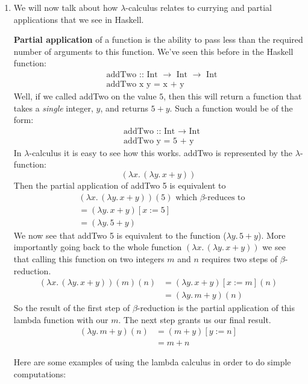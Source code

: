 \documentclass[12pt]{article}
\begin{document}
\begin{enumerate}
\item We will now talk about how $\lambda$-calculus relates to currying and partial applications that we see in Haskell.
\par \textbf{Partial application} of a function is the ability to pass less than the required number of arguments to this function. We've seen this before in the Haskell function:
\begin{align*}
	&\text{addTwo :: Int $\rightarrow$ Int $\rightarrow$ Int}\\
	&\text{addTwo x y = x + y}
\end{align*}
Well, if we called addTwo on the value $5$, then this will return a function that takes a \textit{single} integer, $y$, and returns $5 + y$. Such a function would be of the form:
\begin{align*}
	&\text{addTwo :: Int $\rightarrow$ Int}\\
	&\text{addTwo y = 5 + y}
\end{align*}
In $\lambda$-calculus it is easy to see how this works. addTwo is represented by the $\lambda$-function: $$(\lambda x.\,(\lambda y.\,x+y))$$ Then the partial application of addTwo 5 is equivalent to
\begin{align*}
&(\lambda x.\,(\lambda y.\,x+y))(5)\text{ which } \beta\text{-reduces to}\\
	&= (\lambda y. \, x + y)[x:=5]\\
	&= (\lambda y. \, 5 + y)
\end{align*}
We now see that addTwo 5 is equivalent to the function ($\lambda y. \, 5 + y$). More importantly going back to the whole function $(\lambda x.\,(\lambda y.\,x+y))$ we see that calling this function on two integers $m$ and $n$ requires two steps of $\beta$-reduction. \begin{align*}
(\lambda x.\,(\lambda y.\,x+y))(m)(n) &= (\lambda y. \, x + y)[x:=m](n)\\
	&= (\lambda y. \, m + y)(n)
\end{align*}
So the result of the first step of $\beta$-reduction is the partial application of this lambda function with our $m$. The next step grants us our final result. 
\begin{align*}
(\lambda y.\,m+y)(n)	&= (m + y)[y:=n]\\
	&= m + n
\end{align*}

\bigskip

Here are some examples of using the lambda calculus in order to do simple computations:


\end{enumerate}
\end{document}
